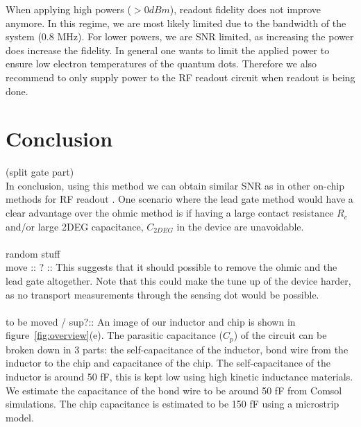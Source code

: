 \documentclass{article}
\begin{document}
When applying high powers ($>0dBm$), readout fidelity does not improve anymore. In this regime, we are most likely limited due to the bandwidth of the system (0.8 MHz). For lower powers, we are SNR limited, as increasing the power does increase the fidelity. In general one wants to limit the applied power to ensure low electron temperatures of the quantum dots. Therefore we also recommend to only supply power to the RF readout circuit when readout is being done. 

\section{Conclusion}
(split gate part) \\
In conclusion, using this method we can obtain similar SNR as in other on-chip methods for RF readout \cite{Connors2020,noiri2020radio}. One scenario where the lead gate method would have a clear advantage over the ohmic method is if having a large contact resistance $R_c$ and/or large 2DEG capacitance, $C_{2DEG}$ in the device are unavoidable.
\\
\\
random stuff\\
move :: ? :: This  suggests that it should possible to remove the ohmic and the lead gate altogether. Note that this could make the tune up of the device harder, as no transport measurements through the sensing dot would be possible.
\\ \\
to be moved / sup?:: 
An image of our inductor and chip is shown in figure\ \ref{fig:overview}(e). The parasitic capacitance ($C_p$)  of the circuit can be broken down in 3 parts: the self-capacitance of the inductor, bond wire from the inductor to the chip and capacitance of the chip. The self-capacitance of the inductor is around 50 fF, this is kept low using high kinetic inductance materials. We estimate the capacitance of the bond wire to be around 50 fF from Comsol simulations. The chip capacitance is estimated to be 150 fF using a microstrip model.

\printbibliography
\end{document}
